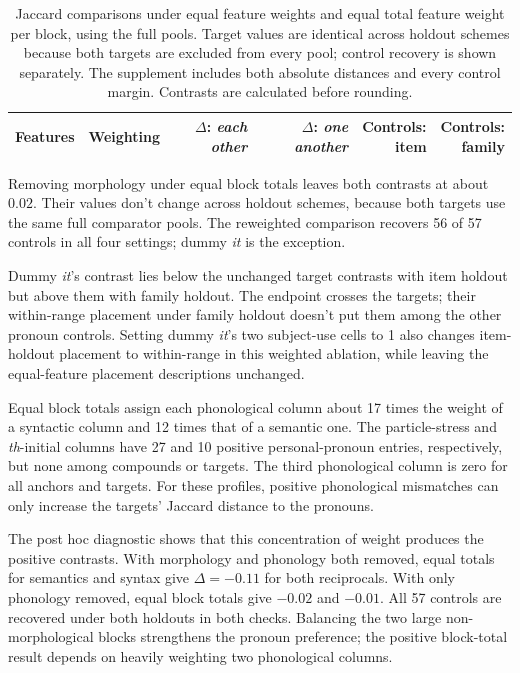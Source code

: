 \documentclass[12pt]{article}
\providecommand{\mention}[1]{\textit{#1}}
\begin{document}
\begin{table}[htbp]
\centering\small
\setlength{\tabcolsep}{4pt}
\begin{tabular}{llrrrr}
\toprule
Features & Weighting & \shortstack{$\Delta$:\\\mention{each other}} & \shortstack{$\Delta$:\\\mention{one another}} & \shortstack{Controls:\\item} & \shortstack{Controls:\\family} \\
\midrule

\end{tabular}
\caption{Jaccard comparisons under equal feature weights and equal total feature weight per block, using the full pools. Target values are identical across holdout schemes because both targets are excluded from every pool; control recovery is shown separately. The supplement includes both absolute distances and every control margin. Contrasts are calculated before rounding.}
\label{tab:blockweight}
\end{table}

Removing morphology under equal block totals leaves both contrasts at about $0.02$. Their values don't change across holdout schemes, because both targets use the same full comparator pools. The reweighted comparison recovers 56 of 57 controls in all four settings; dummy \mention{it} is the exception.

Dummy \mention{it}'s contrast lies below the unchanged target contrasts with item holdout but above them with family holdout. The endpoint crosses the targets; their within-range placement under family holdout doesn't put them among the other pronoun controls. Setting dummy \mention{it}'s two subject-use cells to 1 also changes item-holdout placement to within-range in this weighted ablation, while leaving the equal-feature placement descriptions unchanged.

Equal block totals assign each phonological column about 17 times the weight of a syntactic column and 12 times that of a semantic one. The particle-stress and \mention{th}-initial columns have 27 and 10 positive personal-pronoun entries, respectively, but none among compounds or targets. The third phonological column is zero for all anchors and targets. For these profiles, positive phonological mismatches can only increase the targets' Jaccard distance to the pronouns.

\begin{samepage}
The post hoc diagnostic shows that this concentration of weight produces the positive contrasts. With morphology and phonology both removed, equal totals for semantics and syntax give $\Delta=-0.11$ for both reciprocals. With only phonology removed, equal block totals give $-0.02$ and $-0.01$. All 57 controls are recovered under both holdouts in both checks. Balancing the two large non-morphological blocks strengthens the pronoun preference; the positive block-total result depends on heavily weighting two phonological columns.\par
\end{samepage}
\end{document}
